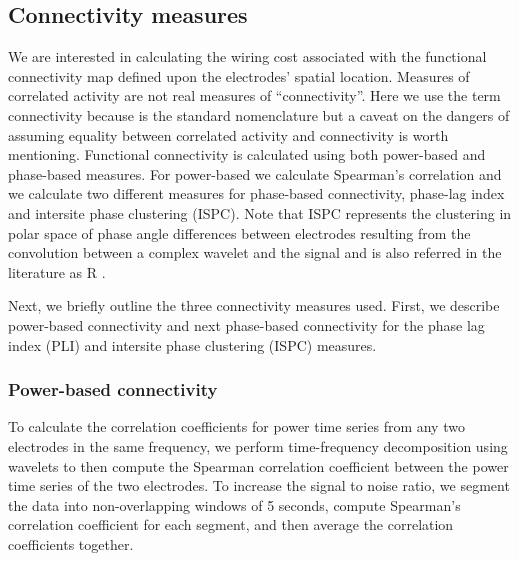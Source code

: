 \documentclass[11pt, onecolumn]{article}
\begin{document}
\subsection{Connectivity measures}
We are interested in calculating the wiring cost associated with the functional connectivity map defined upon the electrodes' spatial location. 
Measures of correlated activity are not real measures of “connectivity”. Here we use the term connectivity because is the standard nomenclature but a caveat on the dangers of assuming equality between correlated activity and connectivity is worth mentioning.
Functional connectivity is calculated using both power-based and phase-based measures. For power-based we calculate Spearman's correlation and we calculate two different measures for phase-based connectivity, phase-lag index \citep{stam2007phase} and intersite phase clustering (ISPC). Note that ISPC represents the clustering in polar space of phase angle differences between electrodes resulting from the convolution between a complex wavelet and the signal and is also referred in the literature as R \citep{cohen2014analyzing}. 

Next, we briefly outline the three connectivity measures used. First, we describe power-based connectivity and next phase-based connectivity for the phase lag index (PLI) and intersite phase clustering (ISPC) measures. 

\subsubsection{Power-based connectivity}
To calculate the correlation coefficients for power time series from any two electrodes in the same frequency, we perform time-frequency decomposition using wavelets to then compute the Spearman correlation coefficient between the power time series of the two electrodes. 
To increase the signal to noise ratio, we segment the data into non-overlapping windows of 5 seconds, compute Spearman's correlation coefficient for each segment, and then average the correlation coefficients together. 
\end{document}

